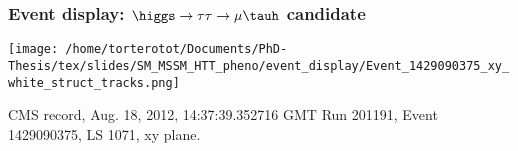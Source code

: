 \begin{frame}
\frametitle{Event display: $\higgs\to\tau\tau\to\mu\tauh$ candidate}
\vfill
\texttt{[image: /home/torterotot/Documents/PhD-Thesis/tex/slides/SM\_MSSM\_HTT\_pheno/event\_display/Event\_1429090375\_xy\_white\_struct\_tracks.png]}

\vfill

{\tiny
CMS record, Aug. 18, 2012, 14:37:39.352716 GMT
\qquad
Run 201191, Event 1429090375, LS 1071, xy plane.
}
\end{frame}

